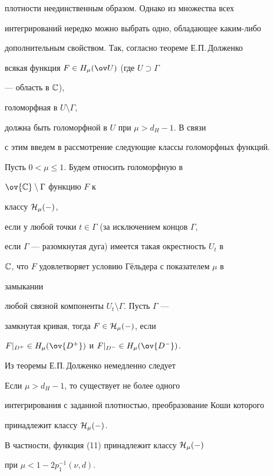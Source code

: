 плотности неединственным образом. Однако из множества всех  


интегрирований нередко можно выбрать одно, обладающее каким-либо  


дополнительным свойством. Так, согласно теореме Е.П.\,Долженко \cite{19} 


всякая функция $F\in H_\mu(\ov U)$ (где $U\supset\Gamma$ 


 --- область в $\Bbb C$), 


голоморфная в $U\setminus\Gamma$, 


должна быть голоморфной в $U$ при $\mu>d_H-1$. В связи 


с этим введем в рассмотрение следующие классы голоморфных функций. 


Пусть $0<\mu\le 1$. Будем относить голоморфную в 


$\ov{\Bbb C}\setminus\Gamma$ функцию $F$ к 


классу $\cal H_\mu(\Gamma)$, 


если у любой точки $t\in\Gamma$ (за исключением концов $\Gamma$, 


если $\Gamma$ --- разомкнутая дуга) имеется такая окрестность $U_t$ в 


$\Bbb C$, что $F$ удовлетворяет условию Г\"ельдера с показателем $\mu$ в 


замыкании 


любой связной компоненты $U_t\setminus\Gamma$. Пусть $\Gamma$ --- 


замкнутая кривая, тогда $F\in\cal H_\mu(\Gamma)$, если 


$F|_{D^+}\in H_\mu(\ov{D^+})$ и $F|_{D^-}\in H_\mu(\ov{D^-})$. 


Из теоремы Е.П.\,Долженко немедленно следует 


 


\begin{thm} Если $\mu>d_H-1$, то существует не более одного 


интегрирования с заданной плотностью, преобразование Коши которого 


принадлежит классу $\cal H_\mu(\Gamma)$. 


\end{thm} 


 


В частности, функция (11) принадлежит классу $\cal H_\mu(\Gamma)$ 


при $\mu<1-2p^{-1}_1(\nu,d)$. 


